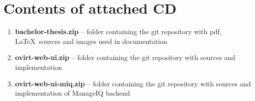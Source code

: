 \chapter{Contents of attached CD}
\begin{enumerate}
\item \textbf{bachelor-thesis.zip} -- folder containing the git repository with pdf, \LaTeX ~sources and images used in documentation
\item \textbf{ovirt-web-ui.zip} -- folder containing the git repository with sources and implementation
\item \textbf{ovirt-web-ui-miq.zip} -- folder containing the git repository with sources and implementation of ManageIQ backend
\end{enumerate}
